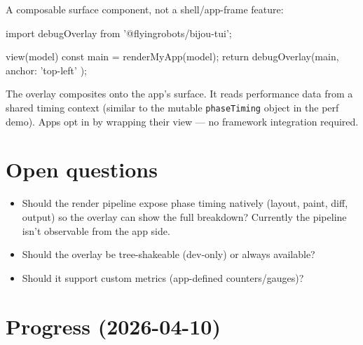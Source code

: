 A composable surface component, not a shell/app-frame feature:

\begin{CodeBlock}
import { debugOverlay } from '@flyingrobots/bijou-tui';

view(model) {
  const main = renderMyApp(model);
  return debugOverlay(main, { anchor: 'top-left' });
}
\end{CodeBlock}

The overlay composites onto the app's surface. It reads performance data from a shared timing context (similar to the mutable \texttt{p\allowbreak{}h\allowbreak{}a\allowbreak{}s\allowbreak{}e\allowbreak{}T\allowbreak{}i\allowbreak{}m\allowbreak{}i\allowbreak{}n\allowbreak{}g} object in the perf demo). Apps opt in by wrapping their view --- no framework integration required.

\section{Open questions}\label{record-338-open-questions}

\begin{itemize}
\tightlist
\item
  Should the render pipeline expose phase timing natively (layout, paint, diff, output) so the overlay can show the full breakdown? Currently the pipeline isn't observable from the app side.
\item
  Should the overlay be tree-shakeable (dev-only) or always available?
\item
  Should it support custom metrics (app-defined counters/gauges)?
\end{itemize}

\section{Progress (2026-04-10)}\label{record-338-progress-2026-04-10}

